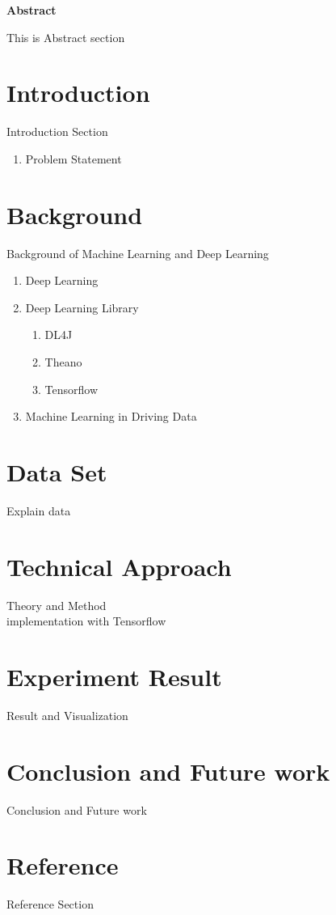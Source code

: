 \documentclass[12pt]{article}
\begin{document}
\maketitle

\begin{center}
\textbf{Abstract}
\end{center}
\noindent
This is Abstract section


\section{Introduction}
Introduction Section
\begin{enumerate}
\item Problem Statement
\end{enumerate}


\section{Background}
Background of Machine Learning and Deep Learning
\begin{enumerate}
\item Deep Learning\\

\item Deep Learning Library\\
	\begin{enumerate}
	\item DL4J\\
	\item Theano\\
	\item Tensorflow\\
	\end{enumerate}

\item Machine Learning in Driving Data\\
\end{enumerate}


\section{Data Set}
Explain data\\


\section{Technical Approach}
Theory and Method\\
implementation with Tensorflow\\


\section{Experiment Result}
Result and Visualization\\


\section{Conclusion and Future work}
Conclusion and Future work\\


\section*{Reference}
Reference Section\\
\end{document}
